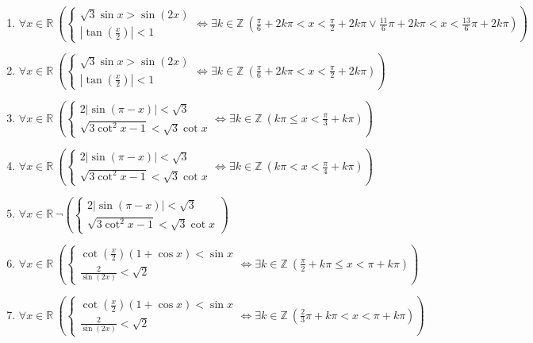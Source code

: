 \documentclass[11pt,a4paper]{article}
\begin{document}
\begin{enumerate}
\item $\displaystyle \forall x \in \mathbb{R}\ \left( \begin{cases} \sqrt{3}\sin x > \sin\left(2x\right) \\ \left|\tan\left(\frac{x}{2}\right)\right| < 1 \end{cases} \iff \exists k \in \mathbb{Z}\ \left( \frac{\pi}{6} + 2k\pi < x < \frac{\pi}{2} + 2k\pi \lor \frac{11}{6}\pi + 2k\pi < x < \frac{13}{6}\pi + 2k\pi \right) \right)$
\item $\displaystyle \forall x \in \mathbb{R}\ \left( \begin{cases} \sqrt{3}\sin x > \sin\left(2x\right) \\ \left|\tan\left(\frac{x}{2}\right)\right| < 1 \end{cases} \iff \exists k \in \mathbb{Z}\ \left( \frac{\pi}{6} + 2k\pi < x < \frac{\pi}{2} + 2k\pi \right) \right)$
\item $\displaystyle \forall x \in \mathbb{R}\ \left( \begin{cases} 2\left|\sin\left(\pi - x\right)\right| < \sqrt{3} \\ \sqrt{3\cot^{2} x - 1} < \sqrt{3}\cot x \end{cases} \iff \exists k \in \mathbb{Z}\ \left( k\pi \le x < \frac{\pi}{3} + k\pi \right) \right)$
\item $\displaystyle \forall x \in \mathbb{R}\ \left( \begin{cases} 2\left|\sin\left(\pi - x\right)\right| < \sqrt{3} \\ \sqrt{3\cot^{2} x - 1} < \sqrt{3}\cot x \end{cases} \iff \exists k \in \mathbb{Z}\ \left( k\pi < x < \frac{\pi}{4} + k\pi \right) \right)$
\item $\displaystyle \forall x \in \mathbb{R}\ \lnot \left( \begin{cases} 2\left|\sin\left(\pi - x\right)\right| < \sqrt{3} \\ \sqrt{3\cot^{2} x - 1} < \sqrt{3}\cot x \end{cases} \right)$
\item $\displaystyle \forall x \in \mathbb{R}\ \left( \begin{cases} \cot\left(\frac{x}{2}\right)(1 + \cos x) < \sin x \\ \frac{2}{\sin\left(2x\right)} < \sqrt{2} \end{cases} \iff \exists k \in \mathbb{Z}\ \left( \frac{\pi}{2} + k\pi \le x < \pi + k\pi \right) \right)$
\item $\displaystyle \forall x \in \mathbb{R}\ \left( \begin{cases} \cot\left(\frac{x}{2}\right)(1 + \cos x) < \sin x \\ \frac{2}{\sin\left(2x\right)} < \sqrt{2} \end{cases} \iff \exists k \in \mathbb{Z}\ \left( \frac{2}{3}\pi + k\pi < x < \pi + k\pi \right) \right)$

\end{enumerate}
\end{document}
